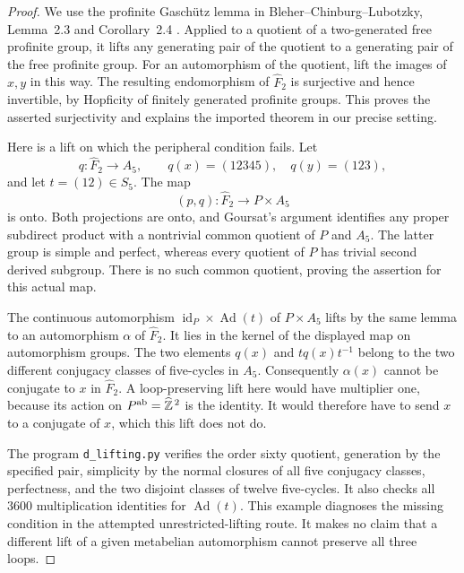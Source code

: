 \begin{proof}
We use the profinite Gasch\"utz lemma in
Bleher--Chinburg--Lubotzky, Lemma~2.3 and Corollary~2.4
\cite{D_BleherChinburgLubotzky}. Applied to a quotient of a
two-generated free profinite group, it lifts any generating pair
of the quotient to a generating pair of the free profinite group.
For an automorphism of the quotient, lift the images of $x,y$ in
this way. The resulting endomorphism of $\widehat F_2$ is
surjective and hence invertible, by Hopficity of finitely generated
profinite groups. This proves the asserted surjectivity and explains
the imported theorem in our precise setting.

Here is a lift on which the peripheral condition fails. Let
\[
 q:\widehat F_2\longrightarrow A_5,\qquad
 q(x)=(12345),\quad q(y)=(123),
\]
and let $t=(12)\in S_5$. The map
\[
 (p,q):\widehat F_2\longrightarrow P\times A_5
\]
is onto. Both projections are onto, and Goursat's argument identifies
any proper subdirect product with a nontrivial common quotient of
$P$ and $A_5$. The latter group is simple and perfect, whereas every
quotient of $P$ has trivial second derived subgroup. There is no such
common quotient, proving the assertion for this actual map.

The continuous automorphism
$\operatorname{id}_P\times\operatorname{Ad}(t)$ of $P\times A_5$
lifts by the same lemma to an automorphism $\alpha$ of
$\widehat F_2$. It lies in the kernel of the displayed map on
automorphism groups. The two elements $q(x)$ and $tq(x)t^{-1}$
belong to the two different conjugacy classes of five-cycles in
$A_5$. Consequently $\alpha(x)$ cannot be conjugate to $x$ in
$\widehat F_2$. A loop-preserving lift here would have multiplier
one, because its action on $P^{\rm ab}=\widehat{\mathbb Z}^{\,2}$
is the identity. It would therefore have to send $x$ to a conjugate
of $x$, which this lift does not do.

The program \texttt{d\_lifting.py} verifies the order sixty quotient,
generation by the specified pair, simplicity by the normal closures
of all five conjugacy classes, perfectness, and the two disjoint
classes of twelve five-cycles. It also checks all $3600$
multiplication identities for $\operatorname{Ad}(t)$.
This example diagnoses the missing condition in the attempted
unrestricted-lifting route. It makes no claim that a different lift
of a given metabelian automorphism cannot preserve all three loops.
\end{proof}
